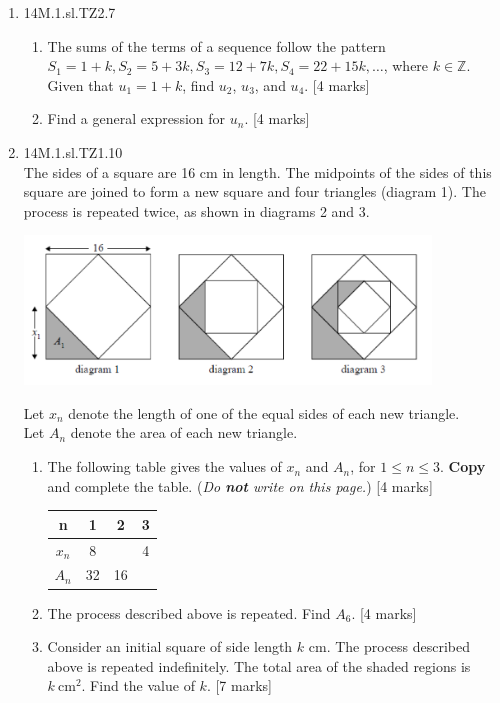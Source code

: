 \documentclass[12pt, twoside]{article}
\begin{document}
\begin{enumerate}
  \item 14M.1.sl.TZ2.7
  \begin{enumerate}
    \item The sums of the terms of a sequence follow the pattern\\
    $S_1 = 1+k, S_2 = 5+3k, S_3 = 12+7k, S_4 = 22+15k, \dots$, where $k \in \mathbb{Z}$.\\
    Given that $u_1=1+k$, find $u_2$, $u_3$, and $u_4$. [4 marks]
    \item Find a general expression for $u_n$. [4 marks]
  \end{enumerate}

  \item 14M.1.sl.TZ1.10\\
  The sides of a square are 16 cm in length. The midpoints of the sides of this square are joined to form a new square and four triangles (diagram 1). The process is repeated twice, as shown in diagrams 2 and 3.
    \begin{center}
      \includegraphics[width=0.85\textwidth]{1-1-P1_Algebra-19.png}
    \end{center}
    Let $x_n$ denote the length of one of the equal sides of each new triangle.\\
    Let $A_n$ denote the area of each new triangle.\\
    \begin{enumerate}
    \item The following table gives the values of $x_n$ and $A_n$, for $1 \leq n \leq 3$. \textbf{Copy} and complete the table. (\emph{Do \textbf{not} write on this page.}) [4 marks]
      \begin{center}
        \begin{tabular}{|c|c|c|c|}
          \hline
          n & 1 & 2 & 3 \\
          \hline
          $x_n$ & 8 &  & 4 \\
          \hline
          $A_n$ & 32 & 16 & \\
          \hline
        \end{tabular}
      \end{center}
    \item The process described above is repeated. Find $A_6$. [4 marks]
    \item Consider an initial square of side length $k$ cm. The process described above is repeated indefinitely. The total area of the shaded regions is $k \  \mathrm{cm}^2$. Find the value of $k$. [7 marks]
  \end{enumerate}


\end{enumerate}
\end{document}
